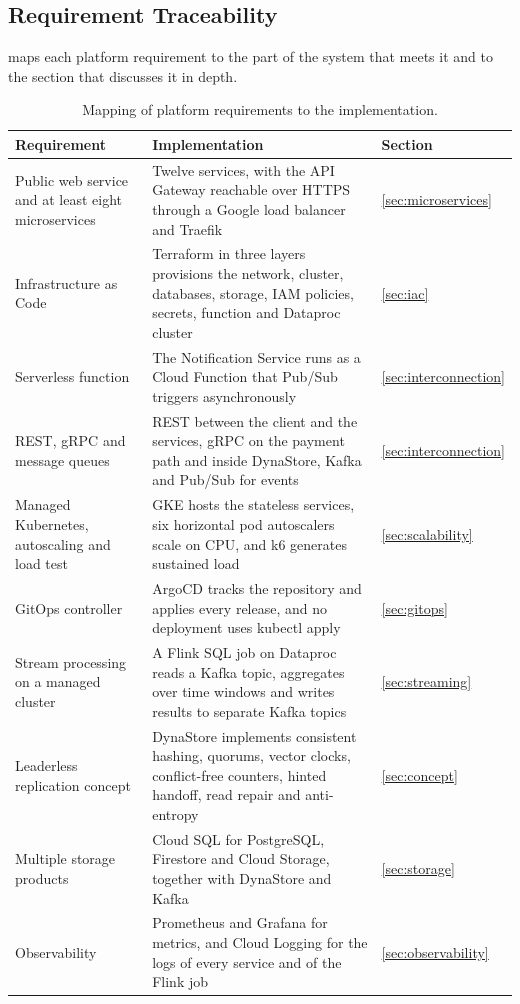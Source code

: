 \documentclass[11pt,a4paper]{article}
\begin{document}
\subsection{Requirement Traceability}
\label{sec:traceability}

 maps each platform requirement to the part of the system that meets it and to the section that discusses it in depth.

\begin{table}[htbp]\centering\small
\caption{Mapping of platform requirements to the implementation.}\label{tab:traceability}
\begin{tabularx}{\linewidth}{@{}L{3.6cm}YL{1.7cm}@{}}
\toprule
Requirement & Implementation & Section \\
\midrule
Public web service and at least eight microservices & Twelve services, with the API Gateway reachable over HTTPS through a Google load balancer and Traefik & \cref{sec:microservices} \\
Infrastructure as Code & Terraform in three layers provisions the network, cluster, databases, storage, IAM policies, secrets, function and Dataproc cluster & \cref{sec:iac} \\
Serverless function & The Notification Service runs as a Cloud Function that Pub/Sub triggers asynchronously & \cref{sec:interconnection} \\
REST, gRPC and message queues & REST between the client and the services, gRPC on the payment path and inside DynaStore, Kafka and Pub/Sub for events & \cref{sec:interconnection} \\
Managed Kubernetes, autoscaling and load test & GKE hosts the stateless services, six horizontal pod autoscalers scale on CPU, and k6 generates sustained load & \cref{sec:scalability} \\
GitOps controller & ArgoCD tracks the repository and applies every release, and no deployment uses kubectl apply & \cref{sec:gitops} \\
Stream processing on a managed cluster & A Flink SQL job on Dataproc reads a Kafka topic, aggregates over time windows and writes results to separate Kafka topics & \cref{sec:streaming} \\
Leaderless replication concept & DynaStore implements consistent hashing, quorums, vector clocks, conflict-free counters, hinted handoff, read repair and anti-entropy & \cref{sec:concept} \\
Multiple storage products & Cloud SQL for PostgreSQL, Firestore and Cloud Storage, together with DynaStore and Kafka & \cref{sec:storage} \\
Observability & Prometheus and Grafana for metrics, and Cloud Logging for the logs of every service and of the Flink job & \cref{sec:observability} \\
\bottomrule
\end{tabularx}
\end{table}
\end{document}

